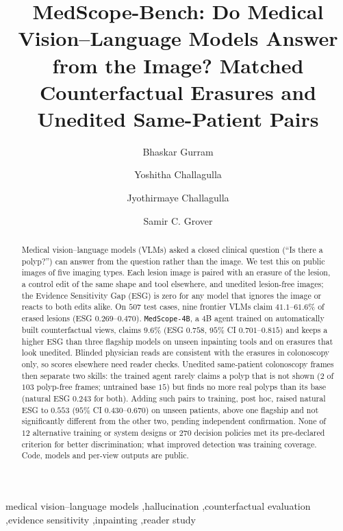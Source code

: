 \documentclass[5p,times,twocolumn,authoryear]{elsarticle}
\newcommand{\toconfirm}[1]{\textcolor{red}{\textbf{[To confirm: #1]}}}
\begin{document}
\begin{frontmatter}
\title{MedScope-Bench: Do Medical Vision--Language Models Answer from the Image? Matched Counterfactual Erasures and Unedited Same-Patient Pairs}

\author[ind]{Bhaskar Gurram}
\author[ind]{Yoshitha Challagulla}
\author[jc]{Jyothirmaye Challagulla}
\author[shn,uoft]{Samir C. Grover}
\address[ind]{Independent Researcher}
\address[jc]{\toconfirm{affiliation of Jyothirmaye Challagulla (internal medicine)}}
\address[shn]{Scarborough Health Network Research Institute, Toronto, Ontario, Canada}
\address[uoft]{Department of Medicine, University of Toronto, Toronto, Ontario, Canada}

\begin{abstract}
Medical vision--language models (VLMs) asked a closed clinical question (``Is there a polyp?'') can answer from the question rather than the image. We test this on public images of five imaging types. Each lesion image is paired with an erasure of the lesion, a control edit of the same shape and tool elsewhere, and unedited lesion-free images; the Evidence Sensitivity Gap (ESG) is zero for any model that ignores the image or reacts to both edits alike. On $507$ test cases, nine frontier VLMs claim $41.1$--$61.6\%$ of erased lesions (ESG $0.269$--$0.470$). \texttt{MedScope-4B}, a 4B agent trained on automatically built counterfactual views, claims $9.6\%$ (ESG $0.758$, $95\%$ CI $0.701$--$0.815$) and keeps a higher ESG than three flagship models on unseen inpainting tools and on erasures that look unedited. Blinded physician reads are consistent with the erasures in colonoscopy only, so scores elsewhere need reader checks. Unedited same-patient colonoscopy frames then separate two skills: the trained agent rarely claims a polyp that is not shown ($2$ of $103$ polyp-free frames; untrained base $15$) but finds no more real polyps than its base (natural ESG $0.243$ for both). Adding such pairs to training, post hoc, raised natural ESG to $0.553$ ($95\%$ CI $0.430$--$0.670$) on unseen patients, above one flagship and not significantly different from the other two, pending independent confirmation. None of $12$ alternative training or system designs or $270$ decision policies met its pre-declared criterion for better discrimination; what improved detection was training coverage. Code, models and per-view outputs are public.
\end{abstract}

\begin{keyword}
medical vision--language models \sep hallucination \sep counterfactual evaluation \sep evidence sensitivity \sep inpainting \sep reader study
\end{keyword}
\end{frontmatter}
\end{document}

